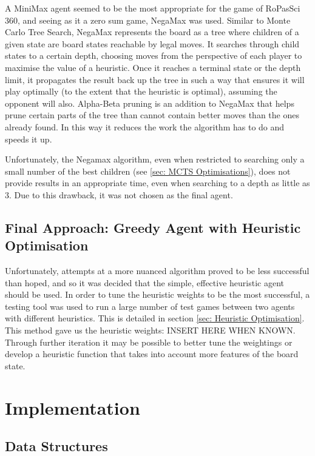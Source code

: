 \documentclass{article}
\begin{document}
A MiniMax agent seemed to be the most appropriate for the game of RoPasSci 360, and seeing as it a zero sum game, NegaMax was used. Similar to Monte Carlo Tree Search, NegaMax represents the board as a tree where children of a given state are board states reachable by legal moves. It searches through child states to a certain depth, choosing moves from the perspective of each player to maximise the value of a heuristic. Once it reaches a terminal state or the depth limit, it propagates the result back up the tree in such a way that ensures it will play optimally (to the extent that the heuristic is optimal), assuming the opponent will also. Alpha-Beta pruning is an addition to NegaMax that helps prune certain parts of the tree than cannot contain better moves than the ones already found. In this way it reduces the work the algorithm has to do and speeds it up. 
\newline

\noindent
Unfortunately, the Negamax algorithm, even when restricted to searching only a small number of the best children (see \ref{sec: MCTS Optimisations}), does not provide results in an appropriate time, even when searching to a depth as little as 3. Due to this drawback, it was not chosen as the final agent.

\subsection{Final Approach: Greedy Agent with Heuristic Optimisation}
Unfortunately, attempts at a more nuanced algorithm proved to be less successful than hoped, and so it was decided that the simple, effective heuristic agent should be used. In order to tune the heuristic weights to be the most successful,  a testing tool was used to run a large number of test games between two agents with different heuristics.  This is detailed in section \ref{sec: Heuristic Optimisation}. This method gave us the heuristic weights: INSERT HERE WHEN KNOWN. Through further iteration it may be possible to better tune the weightings  or develop a heuristic function that takes into account more features of the board state.

\section{Implementation}
\subsection{Data Structures}
\label{sec: Data Structures}
\end{document}

